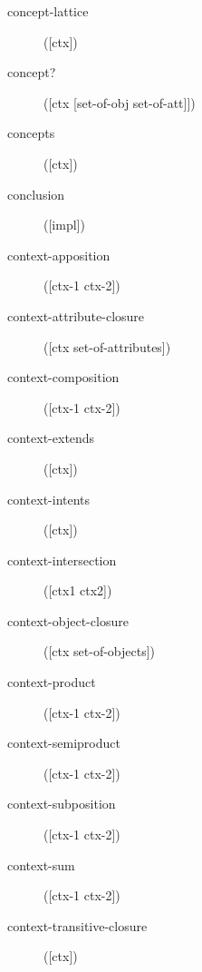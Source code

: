 \begin{description}
  \item[concept-lattice]
([ctx])



  \item[concept?]
([ctx [set-of-obj set-of-att]])



  \item[concepts]
([ctx])



  \item[conclusion]
([impl])



  \item[context-apposition]
([ctx-1 ctx-2])



  \item[context-attribute-closure]
([ctx set-of-attributes])



  \item[context-composition]
([ctx-1 ctx-2])



  \item[context-extends]
([ctx])



  \item[context-intents]
([ctx])



  \item[context-intersection]
([ctx1 ctx2])



  \item[context-object-closure]
([ctx set-of-objects])



  \item[context-product]
([ctx-1 ctx-2])



  \item[context-semiproduct]
([ctx-1 ctx-2])



  \item[context-subposition]
([ctx-1 ctx-2])



  \item[context-sum]
([ctx-1 ctx-2])



  \item[context-transitive-closure]
([ctx])




\end{description}
